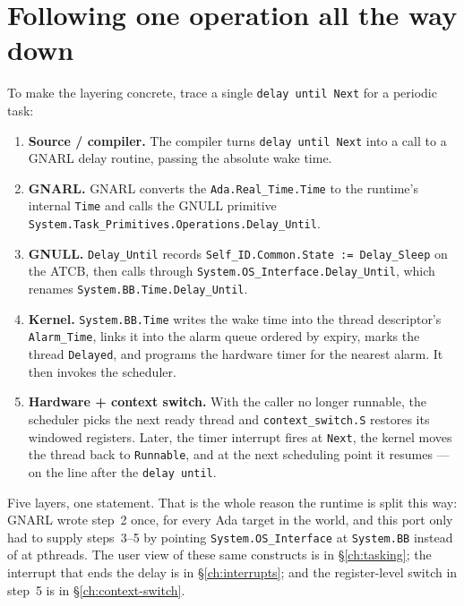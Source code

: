 \section{Following one operation all the way down}

To make the layering concrete, trace a single \texttt{delay until Next} for a
periodic task:

\begin{enumerate}
  \item \textbf{Source / compiler.} The compiler turns \texttt{delay until Next}
        into a call to a GNARL delay routine, passing the absolute wake time.
  \item \textbf{GNARL.} GNARL converts the \texttt{Ada.Real\_Time.Time} to the
        runtime's internal \texttt{Time} and calls the GNULL primitive
        \texttt{System.Task\_Primitives.Operations.Delay\_Until}.
  \item \textbf{GNULL.} \texttt{Delay\_Until} records
        \texttt{Self\_ID.Common.State := Delay\_Sleep} on the ATCB, then calls
        through \texttt{System.OS\_Interface.Delay\_Until}, which renames
        \texttt{System.BB.Time.Delay\_Until}.
  \item \textbf{Kernel.} \texttt{System.BB.Time} writes the wake time into the
        thread descriptor's \texttt{Alarm\_Time}, links it into the alarm queue
        ordered by expiry, marks the thread \texttt{Delayed}, and programs the
        hardware timer for the nearest alarm. It then invokes the scheduler.
  \item \textbf{Hardware + context switch.} With the caller no longer runnable,
        the scheduler picks the next ready thread and \texttt{context\_switch.S}
        restores its windowed registers. Later, the timer interrupt fires at
        \texttt{Next}, the kernel moves the thread back to \texttt{Runnable}, and
        at the next scheduling point it resumes --- on the line after the
        \texttt{delay until}.
\end{enumerate}

Five layers, one statement. That is the whole reason the runtime is split this
way: GNARL wrote step~2 once, for every Ada target in the world, and this port
only had to supply steps~3--5 by pointing \texttt{System.OS\_Interface} at
\texttt{System.BB} instead of at pthreads. The user view of these same
constructs is in \S\ref{ch:tasking}; the interrupt that ends the delay is in
\S\ref{ch:interrupts}; and the register-level switch in step~5 is in
\S\ref{ch:context-switch}.
